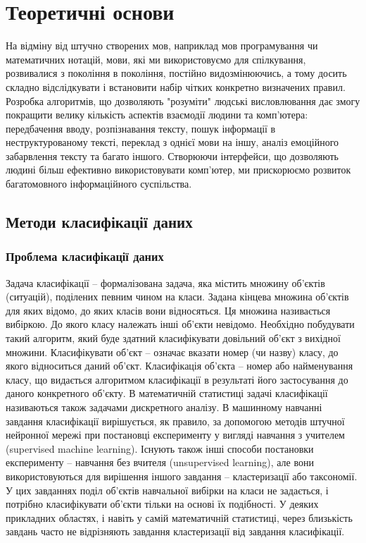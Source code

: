\section{Теоретичні основи}
На відміну від штучно створених мов, наприклад мов програмування чи математичних нотацій,
мови, які ми використовуємо для спілкування, розвивалися з покоління в покоління, постійно
видозмінюючись, а тому досить складно відслідкувати і встановити набір чітких конкретно
визначених правил. Розробка алгоритмів, що дозволяють "розуміти" людські висловлювання
дає змогу покращити велику кількість аспектів взаємодії людини та комп'ютера: передбачення
вводу, розпізнавання тексту, пошук інформації в неструктурованому тексті, переклад з однієї
мови на іншу, аналіз емоційного забарвлення тексту та багато іншого. Створюючи інтерфейси,
що дозволяють людині більш ефективно використовувати комп'ютер, ми прискорюємо
розвиток багатомовного інформаційного суспільства.

\subsection{Методи класифікації даних}

\subsubsection{Проблема класифікації даних}
Задача класифікації – формалізована задача, яка містить множину об’єктів (ситуацій), поділених певним чином на класи. Задана кінцева множина об'єктів для яких відомо, до яких класів вони відносяться. Ця множина називається вибіркою. До якого класу належать інші об'єкти невідомо. Необхідно побудувати такий алгоритм, який буде здатний класифікувати довільний об'єкт з вихідної множини.
Класифікувати об'єкт – означає вказати номер (чи назву) класу, до якого відноситься даний об'єкт.
Класифікація об'єкта – номер або найменування класу, що видається алгоритмом класифікації в результаті його застосування до даного конкретного об'єкту.
В математичній статистиці задачі класифікації називаються також задачами дискретного аналізу. В машинному навчанні завдання класифікації вирішується, як правило, за допомогою методів штучної нейронної мережі при постановці експерименту у вигляді навчання з учителем (supervised machine learning).
Існують також інші способи постановки експерименту – навчання без вчителя (unsupervised learning), але вони використовуються для вирішення іншого завдання – кластеризації або таксономії. У цих завданнях поділ об'єктів навчальної вибірки на класи не задається, і потрібно класифікувати об'єкти тільки на основі їх подібності. У деяких прикладних областях, і навіть у самій математичній статистиці, через близькість завдань часто не відрізняють завдання кластеризації від завдання класифікації.

